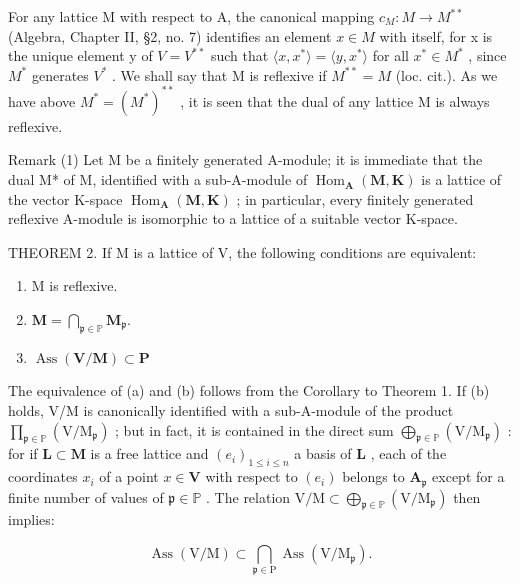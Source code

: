 For any lattice M with respect to A, the canonical mapping \(c_{M}: M \to M^{**}\) (Algebra, Chapter II, §2, no. 7) identifies an element \(x \in M\) with itself, for x is the unique element y of \(V = V^{**}\) such that \(\langle x, x^{*} \rangle = \langle y, x^{*} \rangle\) for all \(x^{*} \in M^{*}\) , since \(M^{*}\) generates \(V^{*}\) . We shall say that M is reflexive if \(M^{**} = M\) (loc. cit.). As we have above \(M^{*} = (M^{*})^{**}\) , it is seen that the dual of any lattice M is always reflexive.

Remark (1) Let M be a finitely generated A-module; it is immediate that the dual M* of M, identified with a sub-A-module of \(\operatorname{Hom}_{\mathbf{A}}(\mathbf{M}, \mathbf{K})\) is a lattice of the vector K-space \(\operatorname{Hom}_{\mathbf{A}}(\mathbf{M}, \mathbf{K})\) ; in particular, every finitely generated reflexive A-module is isomorphic to a lattice of a suitable vector K-space.

THEOREM 2. If M is a lattice of V, the following conditions are equivalent:

\begin{enumerate}
\def\labelenumi{(\alph{enumi})}
\item
  M is reflexive.
\item
  \(\mathbf{M} = \bigcap_{\mathfrak{p}\in \mathbb{P}}\mathbf{M}_{\mathfrak{p}}.\)
\item
  \(\operatorname{Ass}(\mathbf{V} / \mathbf{M})\subset \mathbf{P}\)
\end{enumerate}

The equivalence of (a) and (b) follows from the Corollary to Theorem 1. If (b) holds, V/M is canonically identified with a sub-A-module of the product \(\prod_{\mathfrak{p} \in \mathbb{P}} (\mathrm{V} / \mathrm{M}_{\mathfrak{p}})\) ; but in fact, it is contained in the direct sum \(\bigoplus_{\mathfrak{p} \in \mathbb{P}} (\mathrm{V} / \mathrm{M}_{\mathfrak{p}})\) : for if \(\mathbf{L} \subset \mathbf{M}\) is a free lattice and \((e_i)_{1 \leq i \leq n}\) a basis of \(\mathbf{L}\) , each of the coordinates \(x_i\) of a point \(x \in \mathbf{V}\) with respect to \((e_i)\) belongs to \(\mathbf{A}_{\mathfrak{p}}\) except for a finite number of values of \(\mathfrak{p} \in \mathbb{P}\) . The relation \(\mathrm{V} / \mathrm{M} \subset \bigoplus_{\mathfrak{p} \in \mathbb{P}} (\mathrm{V} / \mathrm{M}_{\mathfrak{p}})\) then implies:

\[
\operatorname{Ass} (\mathrm{V} / \mathrm{M}) \subset \bigcap_ {\mathfrak {p} \in \mathrm{P}} \operatorname{Ass} (\mathrm{V} / \mathrm{M} _ {\mathfrak {p}}).
\]

